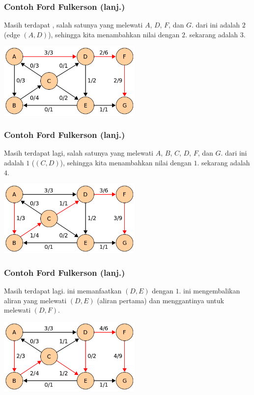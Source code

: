\begin{frame}
\frametitle{Contoh Ford Fulkerson (lanj.)}
Masih terdapat \faugmentingPath, salah satunya yang melewati \fnode $A$, $D$, $F$, dan $G$. \fBottleneck dari \fpath ini adalah $2$ (edge $(A, D)$), sehingga kita menambahkan nilai \fmaxflow dengan $2$. \fMaxflow sekarang adalah $3$.
\newline
\begin{center}
\includegraphics[width=7cm]{asset/ford-example-2.png}
\end{center}
\end{frame}

\begin{frame}
\frametitle{Contoh Ford Fulkerson (lanj.)}
Masih terdapat \faugmentingPath lagi, salah satunya yang melewati \fnode $A$, $B$, $C$, $D$, $F$, dan $G$. \fBottleneck dari \fpath ini adalah $1$ (\fedge $(C, D)$), sehingga kita menambahkan nilai \fmaxflow dengan $1$. \fMaxflow sekarang adalah $4$.
\newline
\begin{center}
\includegraphics[width=7cm]{asset/ford-example-3.png}
\end{center}
\end{frame}

\begin{frame}
\frametitle{Contoh Ford Fulkerson (lanj.)}
Masih terdapat \faugmentingPath lagi. \fAugmentingPath ini memanfaatkan \fbackEdge $(D, E)$ dengan \fresidualCapacity $1$. \fAugmentingPath ini mengembalikan aliran yang melewati \fedge $(D, E)$ (aliran pertama) dan menggantinya untuk melewati \fedge $(D, F)$.
\newline
\begin{center}
\includegraphics[width=7cm]{asset/ford-example-4.png}
\end{center}
\end{frame}

